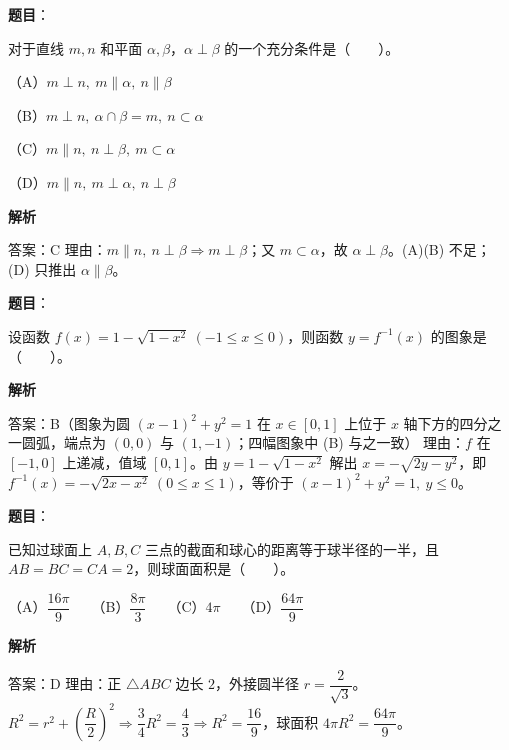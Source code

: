 \begin{answer}

\textbf{题目}：

对于直线 $m,n$ 和平面 $\alpha,\beta$，$\alpha\perp\beta$ 的一个充分条件是\mbox{（　　）}。

（A）$m\perp n,\ m\parallel\alpha,\ n\parallel\beta$

（B）$m\perp n,\ \alpha\cap\beta=m,\ n\subset\alpha$

（C）$m\parallel n,\ n\perp\beta,\ m\subset\alpha$

（D）$m\parallel n,\ m\perp\alpha,\ n\perp\beta$

\textbf{解析}

答案：C
理由：$m\parallel n,\ n\perp\beta\Rightarrow m\perp\beta$；又 $m\subset\alpha$，故 $\alpha\perp\beta$。(A)(B) 不足；(D) 只推出 $\alpha\parallel\beta$。


\end{answer}
\begin{answer}

\textbf{题目}：

设函数 $f(x)=1-\sqrt{1-x^2}\ (-1\le x\le0)$，则函数 $y=f^{-1}(x)$ 的图象是\mbox{（　　）}。
\nopagebreak[4]
\begin{center}\end{center}
\nopagebreak[4]
\textbf{解析}

答案：B（图象为圆 $(x-1)^2+y^2=1$ 在 $x\in[0,1]$ 上位于 $x$ 轴下方的四分之一圆弧，端点为 $(0,0)$ 与 $(1,-1)$；四幅图象中 (B) 与之一致）
理由：$f$ 在 $[-1,0]$ 上递减，值域 $[0,1]$。由 $y=1-\sqrt{1-x^2}$ 解出 $x=-\sqrt{2y-y^2}$，即 $f^{-1}(x)=-\sqrt{2x-x^2}\ (0\le x\le1)$，等价于 $(x-1)^2+y^2=1,\ y\le0$。


\end{answer}
\begin{answer}

\textbf{题目}：

已知过球面上 $A,B,C$ 三点的截面和球心的距离等于球半径的一半，且 $AB=BC=CA=2$，则球面面积是\mbox{（　　）}。

（A）$\dfrac{16\pi}{9}$　　（B）$\dfrac{8\pi}{3}$　　（C）$4\pi$　　（D）$\dfrac{64\pi}{9}$

\textbf{解析}

答案：D
理由：正 $\triangle ABC$ 边长 $2$，外接圆半径 $r=\dfrac{2}{\sqrt3}$。$R^2=r^2+\left(\dfrac R2\right)^2\Rightarrow\dfrac34R^2=\dfrac43\Rightarrow R^2=\dfrac{16}{9}$，球面积 $4\pi R^2=\dfrac{64\pi}{9}$。


\end{answer}
